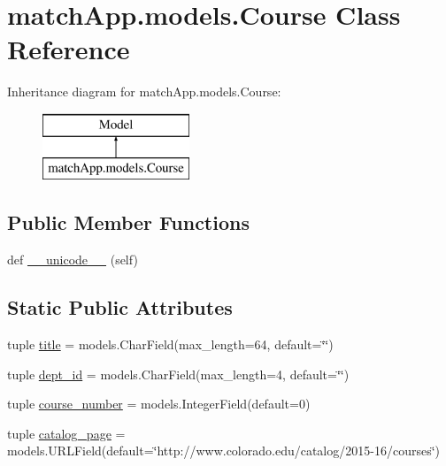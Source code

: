 \hypertarget{classmatch_app_1_1models_1_1_course}{}\section{match\+App.\+models.\+Course Class Reference}
\label{classmatch_app_1_1models_1_1_course}
Inheritance diagram for match\+App.\+models.\+Course\+:\begin{figure}[H]
\begin{center}
\leavevmode
\includegraphics[height=2.000000cm]{classmatch_app_1_1models_1_1_course}
\end{center}
\end{figure}
\subsection*{Public Member Functions}
\begin{DoxyCompactItemize}
\item 
def \hyperlink{classmatch_app_1_1models_1_1_course_aed7d28389b26083cad867c517a9bd291}{\+\_\+\+\_\+unicode\+\_\+\+\_\+} (self)
\end{DoxyCompactItemize}
\subsection*{Static Public Attributes}
\begin{DoxyCompactItemize}
\item 
tuple \hyperlink{classmatch_app_1_1models_1_1_course_afaa80992df56f2f15372c2c523b081c5}{title} = models.\+Char\+Field(max\+\_\+length=64, default=\char`\"{}\char`\"{})
\item 
tuple \hyperlink{classmatch_app_1_1models_1_1_course_a1ed41be5dd960488ff6fe01eb27074f0}{dept\+\_\+id} = models.\+Char\+Field(max\+\_\+length=4, default=\char`\"{}\char`\"{})
\item 
tuple \hyperlink{classmatch_app_1_1models_1_1_course_a1362cefc0918c4ac31f33c4f76197336}{course\+\_\+number} = models.\+Integer\+Field(default=0)
\item 
tuple \hyperlink{classmatch_app_1_1models_1_1_course_a168a91e7508091bc0e34384242946d4e}{catalog\+\_\+page} = models.\+U\+R\+L\+Field(default=\char`\"{}http\+://www.\+colorado.\+edu/catalog/2015-\/16/courses\char`\"{})
\end{DoxyCompactItemize}


